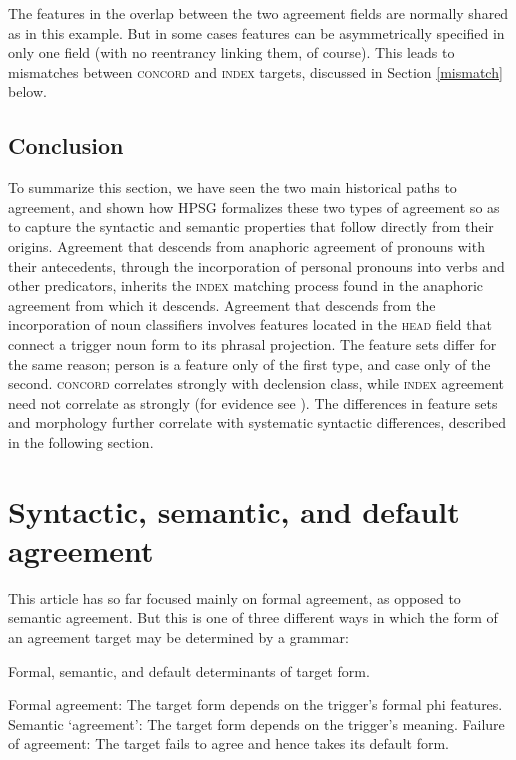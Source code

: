 \documentclass[output=paper]{langsci/langscibook}
\begin{document}
\noindent
The features in the overlap between the two agreement fields are normally shared as in this example.  But in some cases features can be asymmetrically specified in only one field (with no reentrancy linking them, of course).  This leads to mismatches between \textsc{concord} and \textsc{index} targets, discussed in Section \ref{mismatch} below.   

\subsection{Conclusion}
To summarize this section, we have seen the two main historical paths to agreement, and shown how HPSG formalizes these two types of agreement so as to capture the syntactic and semantic properties that follow directly from their origins.  Agreement that descends from anaphoric agreement of pronouns with their antecedents, through the incorporation of personal pronouns into verbs and other predicators, inherits the \textsc{index} matching process found in the anaphoric agreement from which it descends.  Agreement that descends from the incorporation of noun classifiers involves features located in the \textsc{head} field that connect a trigger noun form to its phrasal projection.  The feature sets differ for the same reason; person is a feature only of the first type, and case only of the second.  \textsc{concord} correlates strongly with declension class, while \textsc{index} agreement need not correlate as strongly (for evidence see \citet[ch. \ 2]{Wechsler+Zlatic:2003}).  The differences in feature sets and morphology further correlate with systematic syntactic differences, described in the following section.  


\section{Syntactic, semantic, and default agreement}
\label{pancake-sec}
 
This article has so far focused mainly on formal agreement, as opposed to semantic agreement.   But this is one of three different ways in which the form of an agreement target may be determined by a grammar:	

\begin{exe}
\ex   Formal, semantic, and default determinants of target form. 
\begin{xlist}
\ex	Formal agreement: The target form depends on the trigger's formal phi features.
\ex	Semantic ‘agreement’: The target form depends on the trigger's meaning.
\ex	Failure of agreement: The target fails to agree and hence takes its default form.
\end{xlist}
\end{exe}
\end{document}
